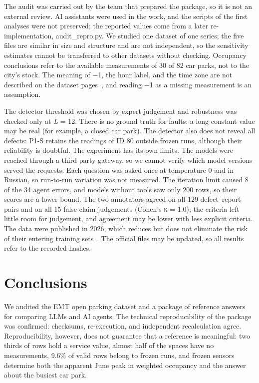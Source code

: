 \documentclass[default]{subfiles}
\begin{document}
{The audit was carried out by the team that prepared the package, so it is not an external review. AI assistants were used in the work, and the scripts of the first analyses were not preserved; the reported values come from a later re-implementation, audit\_repro.py. We studied one dataset of one series; the five files are similar in size and structure and are not independent, so the sensitivity estimates cannot be transferred to other datasets without checking. Occupancy conclusions refer to the available measurements of 30 of 82 car parks, not to the city's stock. The meaning of $-$1, the hour label, and the time zone are not described on the dataset pages~\cite{emt,madrid}, and reading $-$1 as a missing measurement is an assumption.

The detector threshold was chosen by expert judgement and robustness was checked only at \emph{L} = 12. There is no ground truth for faults: a long constant value may be real (for example, a closed car park). The detector also does not reveal all defects: P1-S retains the readings of ID 80 outside frozen runs, although their reliability is doubtful. The experiment has its own limits. The models were reached through a third-party gateway, so we cannot verify which model versions served the requests. Each question was asked once at temperature 0 and in Russian, so run-to-run variation was not measured. The iteration limit caused 8 of the 34 agent errors, and models without tools saw only 200 rows, so their scores are a lower bound. The two annotators agreed on all 129 defect--report pairs and on all 15 false-claim judgements (Cohen's κ = 1.0); the criteria left little room for judgement, and agreement may be lower with less explicit criteria. The data were published in 2026, which reduces but does not eliminate the risk of their entering training sets~\cite{sainz2023}. The official files may be updated, so all results refer to the recorded hashes.

\section{Conclusions}

We audited the EMT open parking dataset and a package of reference answers for comparing LLMs and AI agents. The technical reproducibility of the package was confirmed: checksums, re-execution, and independent recalculation agree. Reproducibility, however, does not guarantee that a reference is meaningful: two thirds of rows hold a service value, almost half of the spaces have no measurements, 9.6\% of valid rows belong to frozen runs, and frozen sensors determine both the apparent June peak in weighted occupancy and the answer about the busiest car park.

}
\end{document}
